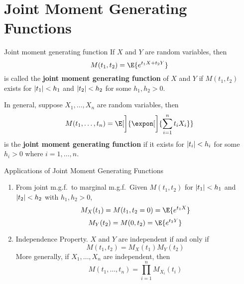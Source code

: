 \section{Joint Moment Generating Functions}
\begin{Definition}{Joint moment generating function}{}
    If $ X $ and $ Y $ are random variables, then
    \[ M(t_1,t_2)=\E{e^{t_1X+t_2Y}} \]
    is called the \textbf{joint moment generating function}
    of $ X $ and $ Y $ if $ M(t_1,t_2) $ exists for
    $ \lvert t_1\rvert<h_1 $ and $ \lvert t_2\rvert<h_2 $
    for some $ h_1,h_2>0 $.
\end{Definition}
\begin{Remark}{}{}
    In general, suppose $ X_1,\ldots,X_n $ are random variables,
    then
    \[ M(t_1,\ldots,t_n)=\E[\bigg]{\expon[\bigg]{\sum_{i=1}^{n} t_i X_i}} \]
    is the \textbf{joint moment generating function}
    if it exists for $ \lvert t_i\rvert<h_i $
    for some $ h_i>0 $ where $ i=1,\ldots,n $.
\end{Remark}
\begin{Remark}{Applications of Joint Moment Generating Functions}{}
    \begin{enumerate}[label=(\arabic*)]
        \item From joint m.g.f.\ to marginal m.g.f.\
              Given $ M(t_1,t_2) $ for $ \lvert t_1\rvert<h_1 $
              and $ \lvert t_2\rvert<h_2 $
              with $ h_1,h_2>0 $,
              \[ M_X(t_1)=M(t_1,t_2=0)=\E{e^{t_1X}} \]
              \[ M_Y(t_2)=M(0,t_2)=\E{e^{t_2Y}} \]
        \item Independence Property. $ X $ and
              $ Y $ are independent if and only if
              \[ M(t_1,t_2)=M_X(t_1)M_Y(t_2) \]
              More generally, if $ X_1,\ldots,X_n $ are
              independent, then
              \[ M(t_1,\ldots,t_n)=\prod_{i=1}^n M_{X_i}(t_i) \]
    \end{enumerate}
\end{Remark}
